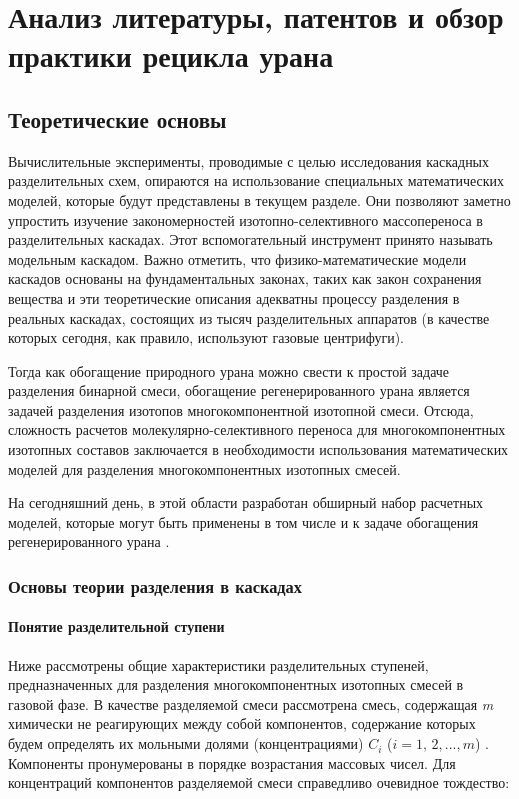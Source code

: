 \chapter{Анализ литературы, патентов и обзор практики рецикла урана}\label{ch1}

\section{Теоретические основы}

Вычислительные эксперименты, проводимые с целью исследования каскадных разделительных схем, опираются на использование специальных математических моделей, которые будут представлены в текущем разделе. Они позволяют заметно упростить изучение закономерностей изотопно-селективного массопереноса в разделительных каскадах. Этот вспомогательный инструмент принято называть модельным каскадом.
Важно отметить, что физико-математические модели каскадов основаны на фундаментальных законах, таких как закон сохранения вещества и эти теоретические описания адекватны процессу разделения в реальных каскадах, состоящих из тысяч разделительных аппаратов (в качестве которых сегодня, как правило, используют газовые центрифуги).

Тогда как обогащение природного урана можно свести к простой задаче разделения бинарной смеси, обогащение регенерированного урана является задачей разделения изотопов многокомпонентной изотопной смеси. Отсюда, сложность расчетов молекулярно-селективного переноса для многокомпонентных изотопных составов заключается в необходимости использования математических моделей для разделения многокомпонентных изотопных смесей.

На сегодняшний день, в этой области разработан обширный набор расчетных моделей, которые могут быть применены в том числе и к задаче обогащения регенерированного урана \cite{smirnovMolekulyarnoselektivnyyMassoperenosKomponentov2013}.


\subsection{Основы теории разделения в каскадах}
\subsubsection{Понятие разделительной ступени}
Ниже рассмотрены общие характеристики разделительных ступеней, предназначенных для разделения многокомпонентных изотопных смесей в газовой фазе. В качестве разделяемой смеси рассмотрена смесь, содержащая \textit{m} химически не реагирующих между собой компонентов, содержание которых будем определять их мольными долями (концентрациями) $C_{i}$ ($i=1,\, 2,...,m$) \cite{sulaberidzeTeoriyaKaskadovDlya2011}. Компоненты пронумерованы в порядке возрастания массовых чисел. Для концентраций компонентов разделяемой смеси справедливо очевидное тождество:

